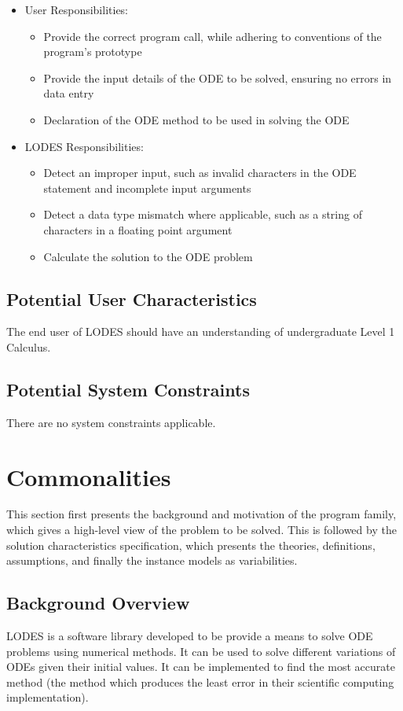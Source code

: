 \documentclass[12pt]{article}
\newcommand{\famname}{LODES} %
\begin{document}
\begin{itemize}
\item User Responsibilities:
\begin{itemize}
\item Provide the correct program call, while adhering to conventions of the program's prototype
\item Provide the input details of the ODE to be solved, ensuring no errors in data entry
\item Declaration of the ODE method to be used in solving the ODE
\end{itemize}
\item \famname{} Responsibilities:
\begin{itemize}
\item Detect an improper input, such as invalid characters in the ODE statement and incomplete input arguments
\item Detect a data type mismatch where applicable, such as a string of characters in a floating point argument
\item Calculate the solution to the ODE problem
\end{itemize}
\end{itemize}

\subsection{Potential User Characteristics} \label{SecUserCharacteristics}

The end user of \famname{} should have an understanding of undergraduate Level
1 Calculus.

\subsection{Potential System Constraints}

There are no system constraints applicable.

\section{Commonalities}
This section first presents the background and motivation of the program family, which gives a
high-level view of the problem to be solved.  This is followed by the solution characteristics
specification, which presents the theories, definitions, assumptions, and finally
the instance models as variabilities.

\subsection{Background Overview} \label{Sec_Background}
\famname{} is a software library developed to be provide a means to solve ODE problems
using numerical methods. It can be used to solve different variations of ODEs given their
initial values. It can be implemented to find the most accurate method (the method which
produces the least error in their scientific computing implementation).
\end{document}
